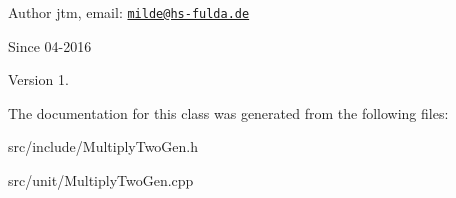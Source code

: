 \begin{DoxyAuthor}{Author}
jtm, email\-:  \href{mailto:milde@hs-fulda.de}{\tt milde@hs-\/fulda.\-de} 
\end{DoxyAuthor}
\begin{DoxySince}{Since}
04-\/2016 
\end{DoxySince}
\begin{DoxyVersion}{Version}
1. 
\end{DoxyVersion}


The documentation for this class was generated from the following files\-:\begin{DoxyCompactItemize}
\item 
src/include/Multiply\-Two\-Gen.\-h\item 
src/unit/Multiply\-Two\-Gen.\-cpp\end{DoxyCompactItemize}
